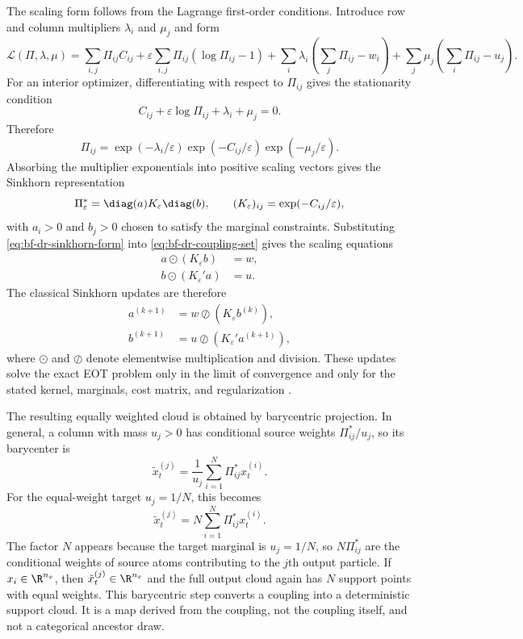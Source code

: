 The scaling form follows from the Lagrange first-order conditions.  Introduce
row and column multipliers $\lambda_i$ and $\mu_j$ and form
\[
  \mathcal L(\Pi,\lambda,\mu)
  =
  \sum_{i,j}\Pi_{ij}C_{ij}
  + \varepsilon\sum_{i,j}\Pi_{ij}(\log\Pi_{ij}-1)
  + \sum_i\lambda_i\left(\sum_j\Pi_{ij}-w_i\right)
  + \sum_j\mu_j\left(\sum_i\Pi_{ij}-u_j\right).
\]
For an interior optimizer, differentiating with respect to $\Pi_{ij}$ gives
the stationarity condition
\begin{equation}
\label{eq:bf-dr-eot-stationarity}
  C_{ij}
  + \varepsilon \log \Pi_{ij}
  + \lambda_i + \mu_j
  = 0 .
\end{equation}
Therefore
\begin{equation}
\label{eq:bf-dr-gibbs-factorization}
  \Pi_{ij}
  =
  \exp(-\lambda_i/\varepsilon)
  \exp(-C_{ij}/\varepsilon)
  \exp(-\mu_j/\varepsilon).
\end{equation}
Absorbing the multiplier exponentials into positive scaling vectors gives the
Sinkhorn representation
\begin{equation}
\label{eq:bf-dr-sinkhorn-form}
  \Pi_\varepsilon^* = \diag(a) K_\varepsilon \diag(b),
  \qquad
  (K_\varepsilon)_{ij} = \exp(-C_{ij}/\varepsilon),
\end{equation}
with $a_i>0$ and $b_j>0$ chosen to satisfy the marginal constraints.
Substituting \eqref{eq:bf-dr-sinkhorn-form} into
\eqref{eq:bf-dr-coupling-set} gives the scaling equations
\begin{align}
\label{eq:bf-dr-sinkhorn-marginals}
  a \odot (K_\varepsilon b) &= w,\\
  b \odot (K_\varepsilon' a) &= u.
\end{align}
The classical Sinkhorn updates are therefore
\begin{align}
\label{eq:bf-dr-sinkhorn-updates}
  a^{(k+1)} &= w \oslash (K_\varepsilon b^{(k)}),\\
  b^{(k+1)} &= u \oslash (K_\varepsilon' a^{(k+1)}),
\end{align}
where $\odot$ and $\oslash$ denote elementwise multiplication and division.
These updates solve the exact EOT problem only in the limit of convergence and
only for the stated kernel, marginals, cost matrix, and regularization
\citep{cuturi2013sinkhorn}.

The resulting equally weighted cloud is obtained by barycentric projection.  In
general, a column with mass $u_j>0$ has conditional source weights
$\Pi_{ij}^*/u_j$, so its barycenter is
\[
  \tilde x_t^{(j)}
  =
  \frac{1}{u_j}\sum_{i=1}^N \Pi_{ij}^*x_t^{(i)}.
\]
For the equal-weight target $u_j=1/N$, this becomes
\begin{equation}
\label{eq:bf-dr-barycentric-map}
  \tilde x_t^{(j)} = N \sum_{i=1}^N \Pi_{ij}^* x_t^{(i)}.
\end{equation}
The factor $N$ appears because the target marginal is $u_j=1/N$, so
$N\Pi_{ij}^*$ are the conditional weights of source atoms contributing to the
$j$th output particle.  If $x_i\in\R^{n_x}$, then
$\tilde x_t^{(j)}\in\R^{n_x}$ and the full output cloud again has $N$ support
points with equal weights.  This barycentric step converts a coupling into a
deterministic support cloud.  It is a map derived from the coupling, not the
coupling itself, and not a categorical ancestor draw.

